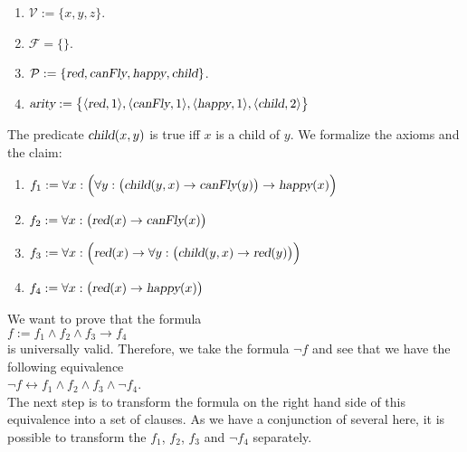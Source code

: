 \begin{enumerate}
\item $\mathcal{V} := \{x,y,z\}$.
\item $\mathcal{F} = \{\}$.
\item $\mathcal{P} := \{ \textsl{red}, \textsl{canFly}, \textsl{happy}, \textsl{child} \}$.
\item $\textsl{arity} := \bigl\{ \pair(\textsl{red},1), \pair(\textsl{canFly},1),
  \pair(\textsl{happy},1), \pair(\textsl{child},2)\bigr\}$
\end{enumerate}
The predicate  $\textsl{child}(x,y)$ is true iff $x$ is a child of $y$.
We formalize the axioms and the claim:
\begin{enumerate}
\item $f_1 := \forall x: \Bigl(\forall y: \big(\textsl{child}(y,x) \rightarrow \textsl{canFly}(y)\big) \rightarrow \textsl{happy}(x)\Bigr)$
\item $f_2 := \forall x: \bigl(\textsl{red}(x) \rightarrow \textsl{canFly}(x)\bigr)$
\item $f_3 := \forall x: \Bigl(\textsl{red}(x) \rightarrow \forall y: \bigl(\textsl{child}(y,x) \rightarrow \textsl{red}(y)\bigr)\Bigr)$
\item $f_4 := \forall x: \bigl(\textsl{red}(x) \rightarrow \textsl{happy}(x)\bigr)$
\end{enumerate}
We want to prove that the formula \\[0.2cm]
\hspace*{1.3cm} $f := f_1 \wedge f_2 \wedge f_3 \rightarrow f_4$ \\[0.2cm]
is universally valid.  Therefore, we take the formula $\neg f$ and see that we have the following
equivalence
\\[0.2cm]
\hspace*{1.3cm} $\neg f \leftrightarrow f_1 \wedge f_2 \wedge f_3 \wedge \neg f_4$. \\[0.2cm]
The next step is to transform the formula on the right hand side of this equivalence into a set of clauses.
As we have a conjunction of several \formulae here, it is possible to transform the \formulae
$f_1$, $f_2$, $f_3$ and  $\neg f_4$  separately.
